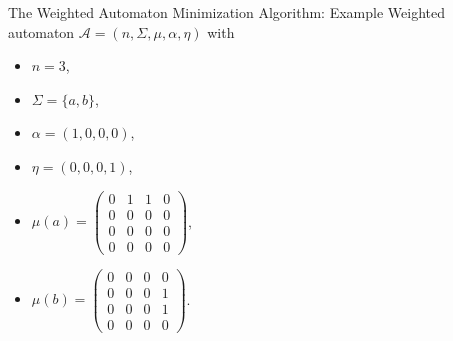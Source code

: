 \documentclass[rgb, pdf]{beamer}
\begin{document}
    
    \begin{frame}[allowframebreaks]{The Weighted Automaton Minimization Algorithm: Example}
         Weighted automaton $\mathcal{A} = (n, \Sigma, \mu, \alpha, \eta)$ with \\ \vspace{0.5cm}
            \begin{minipage}{0.25\textwidth}
                \begin{itemize}
                    \item $n = 3$,
                    \item $\Sigma = \{a, b\}$,
                    \item $\alpha = (1,0,0,0)$,
                    \item $\eta = (0,0,0,1)$,
                \end{itemize}
            \end{minipage} \begin{minipage}{0.3\textwidth}
             \begin{itemize}
                 \item $\mu(a) = \begin{pmatrix}
                                    0 & 1 & 1 & 0 \\
                                    0 & 0 & 0 & 0 \\
                                    0 & 0 & 0 & 0 \\
                                    0 & 0 & 0 & 0
                                \end{pmatrix}$, \vspace{0.2cm} \\
                    \item $\mu(b)= \begin{pmatrix}
                                    0 & 0 & 0 & 0 \\
                                    0 & 0 & 0 & 1 \\
                                    0 & 0 & 0 & 1 \\
                                    0 & 0 & 0 & 0
                                 \end{pmatrix}
                                $.
                \end{itemize}
            \end{minipage}
            \begin{minipage}{0.3\textwidth}
            \begin{center}

\end{center}
\end{minipage}
\end{frame}
\end{document}
